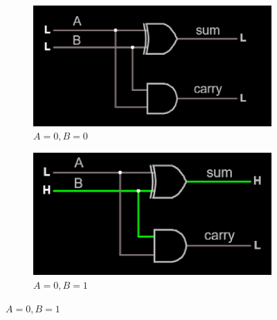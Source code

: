 \documentclass{article}
\begin{document}
	\begin{figure}[H]
		\centering
		\begin{subfigure}[t]{0.4\textwidth}
			\centering
			\includegraphics[width=\textwidth]{half_adder/half_adder_00}
			\caption{$A=0, B=0$}
		\end{subfigure}
		\begin{subfigure}[t]{.4\textwidth}
			\centering
			\includegraphics[width=\textwidth]{half_adder/half_adder_01.png}
			\caption{$A=0, B=1$}
		\end{subfigure}
		

\end{figure}
\end{document}

